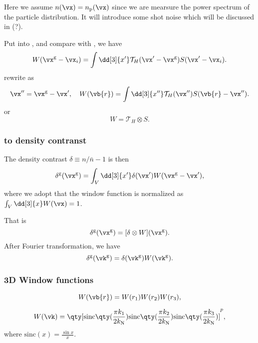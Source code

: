 \documentclass{article}
\newcommand{\sinc}{\mathrm{sinc}}
\newcommand{\kNyq}{k_{\rm N}}
\begin{document}
Here we assume $n(\vx) = n_{\rm p}(\vx)$ since we are mearsure the power spectrum of the particle distribution. It will introduce some shot noise which will be discussed in (?). 

Put  into , and compare with , we have
\begin{equation}
    W(\vx^{\rm g}- \vx_{i}) = \int \dd[3]{x^{\prime}} \mathcal{T}_{H}(\vx^{\prime} - \vx^{\rm g}) S(\vx^{\prime} - \vx_{i}).
\end{equation}
rewrite as
\begin{eqnarray}
    \vx^{\prime\prime} = \vx^{\rm g} - \vx^{\prime}, \quad
    W(\vb{r}) = \int \dd[3]{x^{\prime\prime}} \mathcal{T}_{H}(\vx^{\prime\prime}) S(\vb{r} - \vx^{\prime\prime}).
\end{eqnarray}
or 
\begin{equation}
    W = \mathcal{T}_{H} \otimes S.
\end{equation}

\subsubsection*{to density contranst}
The density contrast $\delta \equiv n/\bar{n} - 1$ is then
\begin{equation}
    \delta^{\rm g}(\vx^{\rm g}) = \int_{V} \dd[3]{x^{\prime}} \delta(\vx^{\prime}) W(\vx^{\rm g}- \vx^{\prime}), 
\end{equation}
where we adopt that the window function is normalized as $\int_{V} \dd[3]{x} W(\vx) = 1$.

That is 
\begin{equation}
    \delta^{\rm g}(\vx^{\rm g}) = [\delta \otimes W](\vx^{\rm g}).
\end{equation}
After Fourier transformation, we have
\begin{equation}
    \delta^{\rm g}(\vk^{\rm g}) = \delta(\vk^{\rm g}) W(\vk^{\rm g}).
\end{equation}

\subsubsection{3D Window functions}

\begin{equation}
    W(\vb{r}) = W(r_1) W(r_2) W(r_3),
\end{equation}

\begin{equation}
    W(\vk) = {\qty[\sinc \qty(\frac{\pi k_1}{2 \kNyq})  \sinc \qty(\frac{\pi k_2}{2 \kNyq})  \sinc \qty(\frac{\pi k_3}{2 \kNyq})]}^{p}, 
\end{equation}
where $\sinc(x) = \frac{\sin x}{x}$. 
\end{document}
